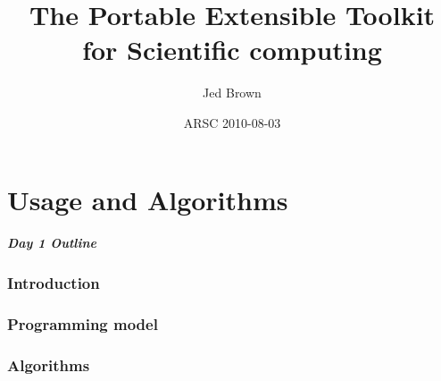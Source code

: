 \documentclass{beamer}
\title[PETSc]{The Portable Extensible Toolkit for Scientific computing}
\author{Jed Brown}
\institute[ETH Z\"urich]
{

}
\date{ARSC 2010-08-03}
\begin{document}
\lstset{language=C}

\begin{frame}
\titlepage
\end{frame}



\part{Usage and Algorithms}
\begin{frame}
\frametitle{Day 1 Outline}
\tableofcontents
\end{frame}

\section{Introduction}





\section{Programming model}





\section{Algorithms}

% 
% 
% 


\end{document}
